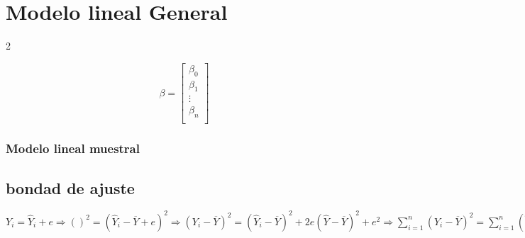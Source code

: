 \chapter{Modelo lineal General}
\begin{multicols}{2}


$$\beta = \begin{bmatrix}
    \beta_0\\
    \beta_1\\
    \vdots\\
    \beta_n\\
\end{bmatrix}$$

\subsection{Modelo lineal muestral}


\section*{bondad de ajuste}
$Y_i = \hat{Y}_i + e \Longrightarrow ()^2 = (\hat{Y}_i - \overline{Y} + e)^2 \Longrightarrow (Y_i - \overline{Y})^2=(\hat{Y}_i-\overline{Y})^2+2e(\hat{Y}-\overline{Y})^2+e^2 \Longrightarrow \sum\limits_{i=1}^n(Y_i-\overline{Y})^2 = \sum\limits_{i=1}^n (\hat{Y}-\overline{Y})^2 + 2\sum\limits_{i=1}^n e_i (\hat{Y}_i - \overline{Y})+ \sum\limits_{i=1}^n e_i^2$

\end{multicols}

